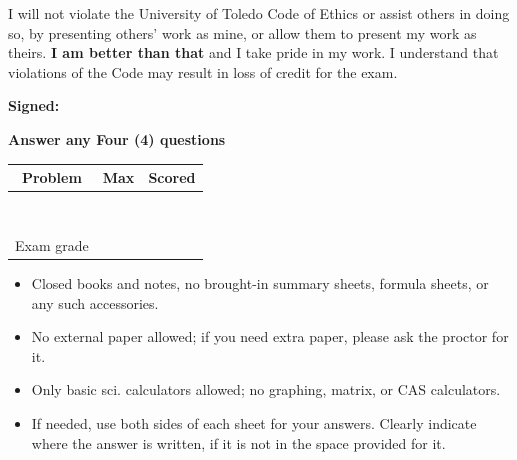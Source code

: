 \documentclass[10pt,twoside,sfsidenotes]{tufte-handout}
\date{} %
\begin{document}
\setlength\abovedisplayskip{2pt}
\setlength\belowdisplayskip{2pt}
\setlength\abovedisplayshortskip{2pt}
\setlength\belowdisplayshortskip{2pt}

\vspace*{1in}

\begin{fullwidth}
   {\large I will not violate the University of Toledo Code of Ethics or assist others in doing so, by presenting others' work as mine, or
   allow them to present my work as theirs. \textbf{I am better than that} and I take pride in my work. 
   I understand that violations of the Code may result in loss of credit for the exam.

  \vspace{.5in}

    \textbf{Signed:}
  }
\end{fullwidth}

  \vfill
  {\LARGE\textbf{Answer any Four (4) questions}}
  \vspace{.5in}


\begin{center}\Large
  \begin{tabular}{c | c | c}
    Problem & Max & Scored \\ \hline
     & & \\ \hline
     & & \\ \hline
     & & \\ \hline
     & & \\ \hline
     & & \\ \hline
     & & \\ \hline
     & & \\ \hline
     & & \\ \hline
    Exam grade & & \\ \hline
  \end{tabular}
  \end{center}

  \vfill

  \begin{fullwidth}
{\large
  \begin{itemize}
    \item Closed books and notes, no brought-in summary sheets, formula sheets, or any such accessories.
    \item No external paper allowed; if you need extra paper, please ask the proctor for it.
    \item Only basic sci. calculators allowed; no graphing, matrix, or CAS calculators.
    \item If needed, use both sides of each sheet for your answers. Clearly indicate where the answer is written, if it is not in the space provided for it.
  \end{itemize}
  }
\end{fullwidth}
\clearpage
\end{document}
